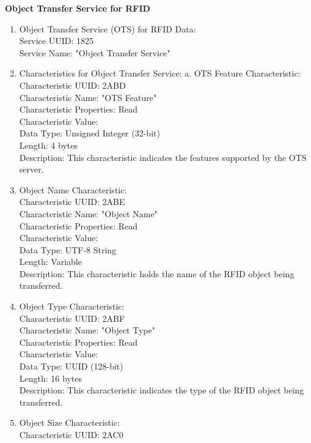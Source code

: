 \documentclass[a4paper,11pt]{article}%
\begin{document}
\textbf{Object Transfer Service for RFID}
\begin{enumerate}
    \item Object Transfer Service (OTS) for RFID Data:\\
    Service UUID: 1825\\
    Service Name: "Object Transfer Service"
    \item Characteristics for Object Transfer Service: a. OTS Feature Characteristic:\\
    Characteristic UUID: 2ABD\\
    Characteristic Name: "OTS Feature"\\
    Characteristic Properties: Read\\
    Characteristic Value:\\
    Data Type: Unsigned Integer (32-bit)\\
    Length: 4 bytes\\
    Description: This characteristic indicates the features supported by the OTS server.
    \item Object Name Characteristic:\\
    Characteristic UUID: 2ABE\\
    Characteristic Name: "Object Name"\\
    Characteristic Properties: Read\\
    Characteristic Value:\\
    Data Type: UTF-8 String\\
    Length: Variable\\
    Description: This characteristic holds the name of the RFID object being transferred.\\
    \item Object Type Characteristic:\\
    Characteristic UUID: 2ABF\\
    Characteristic Name: "Object Type"\\
    Characteristic Properties: Read\\
    Characteristic Value:\\
    Data Type: UUID (128-bit)\\
    Length: 16 bytes\\
    Description: This characteristic indicates the type of the RFID object being transferred.\\
    \item Object Size Characteristic:\\
    Characteristic UUID: 2AC0\\

\end{enumerate}
\end{document}
